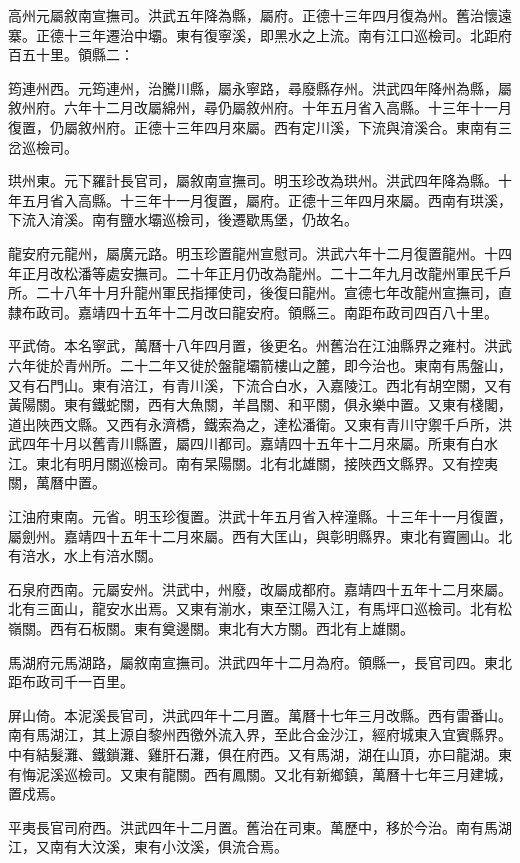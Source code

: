 高州元屬敘南宣撫司。洪武五年降為縣，屬府。正德十三年四月復為州。舊治懷遠寨。正德十三年遷治中壩。東有復寧溪，即黑水之上流。南有江口巡檢司。北距府百五十里。領縣二：

筠連州西。元筠連州，治騰川縣，屬永寧路，尋廢縣存州。洪武四年降州為縣，屬敘州府。六年十二月改屬綿州，尋仍屬敘州府。十年五月省入高縣。十三年十一月復置，仍屬敘州府。正德十三年四月來屬。西有定川溪，下流與淯溪合。東南有三岔巡檢司。

珙州東。元下羅計長官司，屬敘南宣撫司。明玉珍改為珙州。洪武四年降為縣。十年五月省入高縣。十三年十一月復置，屬府。正德十三年四月來屬。西南有珙溪，下流入淯溪。南有鹽水壩巡檢司，後遷歇馬堡，仍故名。

龍安府元龍州，屬廣元路。明玉珍置龍州宣慰司。洪武六年十二月復置龍州。十四年正月改松潘等處安撫司。二十年正月仍改為龍州。二十二年九月改龍州軍民千戶所。二十八年十月升龍州軍民指揮使司，後復曰龍州。宣德七年改龍州宣撫司，直隸布政司。嘉靖四十五年十二月改曰龍安府。領縣三。南距布政司四百八十里。

平武倚。本名寧武，萬曆十八年四月置，後更名。州舊治在江油縣界之雍村。洪武六年徙於青州所。二十二年又徙於盤龍壩箭樓山之麓，即今治也。東南有馬盤山，又有石門山。東有涪江，有青川溪，下流合白水，入嘉陵江。西北有胡空關，又有黃陽關。東有鐵蛇關，西有大魚關，羊昌關、和平關，俱永樂中置。又東有棧閣，道出陜西文縣。又西有永濟橋，鐵索為之，達松潘衛。又東有青川守禦千戶所，洪武四年十月以舊青川縣置，屬四川都司。嘉靖四十五年十二月來屬。所東有白水江。東北有明月關巡檢司。南有杲陽關。北有北雄關，接陜西文縣界。又有控夷關，萬曆中置。

江油府東南。元省。明玉珍復置。洪武十年五月省入梓潼縣。十三年十一月復置，屬劍州。嘉靖四十五年十二月來屬。西有大匡山，與彰明縣界。東北有竇圌山。北有涪水，水上有涪水關。

石泉府西南。元屬安州。洪武中，州廢，改屬成都府。嘉靖四十五年十二月來屬。北有三面山，龍安水出焉。又東有湔水，東至江陽入江，有馬坪口巡檢司。北有松嶺關。西有石板關。東有奠邊關。東北有大方關。西北有上雄關。

馬湖府元馬湖路，屬敘南宣撫司。洪武四年十二月為府。領縣一，長官司四。東北距布政司千一百里。

屏山倚。本泥溪長官司，洪武四年十二月置。萬曆十七年三月改縣。西有雷番山。南有馬湖江，其上源自黎州西徼外流入界，至此合金沙江，經府城東入宜賓縣界。中有結髮灘、鐵鎖灘、雞肝石灘，俱在府西。又有馬湖，湖在山頂，亦曰龍湖。東有悔泥溪巡檢司。又東有龍關。西有鳳關。又北有新鄉鎮，萬曆十七年三月建城，置戍焉。

平夷長官司府西。洪武四年十二月置。舊治在司東。萬歷中，移於今治。南有馬湖江，又南有大汶溪，東有小汶溪，俱流合焉。

